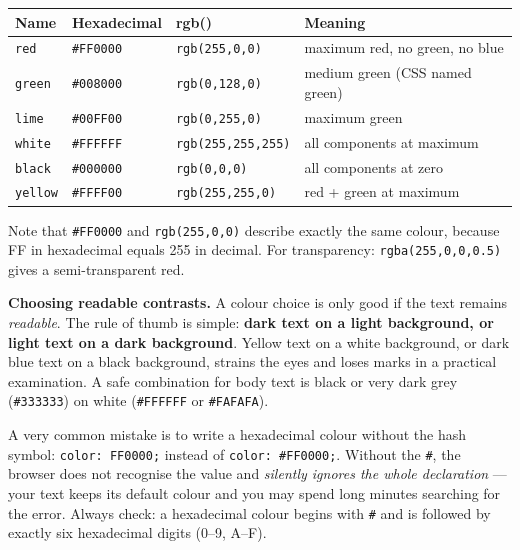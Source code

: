 \documentclass[11pt]{article}
\begin{document}
\begin{exemplebox}
\begin{center}
\begin{tabularx}{\linewidth}{|l|l|l|X|}
\hline
\rowcolor{popblueL} \textbf{Name} & \textbf{Hexadecimal} & \textbf{rgb()} & \textbf{Meaning} \\
\hline
\texttt{red} & \texttt{\#FF0000} & \texttt{rgb(255,0,0)} & maximum red, no green, no blue \\
\hline
\texttt{green} & \texttt{\#008000} & \texttt{rgb(0,128,0)} & medium green (CSS named green) \\
\hline
\texttt{lime} & \texttt{\#00FF00} & \texttt{rgb(0,255,0)} & maximum green \\
\hline
\texttt{white} & \texttt{\#FFFFFF} & \texttt{rgb(255,255,255)} & all components at maximum \\
\hline
\texttt{black} & \texttt{\#000000} & \texttt{rgb(0,0,0)} & all components at zero \\
\hline
\texttt{yellow} & \texttt{\#FFFF00} & \texttt{rgb(255,255,0)} & red + green at maximum \\
\hline
\end{tabularx}
\end{center}
Note that \texttt{\#FF0000} and \texttt{rgb(255,0,0)} describe exactly the same colour, because FF in hexadecimal equals 255 in decimal. For transparency: \texttt{rgba(255,0,0,0.5)} gives a semi-transparent red.
\end{exemplebox}

\textbf{Choosing readable contrasts.} A colour choice is only good if the text remains \emph{readable}. The rule of thumb is simple: \textbf{dark text on a light background, or light text on a dark background}. Yellow text on a white background, or dark blue text on a black background, strains the eyes and loses marks in a practical examination. A safe combination for body text is black or very dark grey (\texttt{\#333333}) on white (\texttt{\#FFFFFF} or \texttt{\#FAFAFA}).

\begin{attention}
A very common mistake is to write a hexadecimal colour without the hash symbol: \texttt{color: FF0000;} instead of \texttt{color: \#FF0000;}. Without the \texttt{\#}, the browser does not recognise the value and \emph{silently ignores the whole declaration} --- your text keeps its default colour and you may spend long minutes searching for the error. Always check: a hexadecimal colour begins with \texttt{\#} and is followed by exactly six hexadecimal digits (0--9, A--F).
\end{attention}
\end{document}
